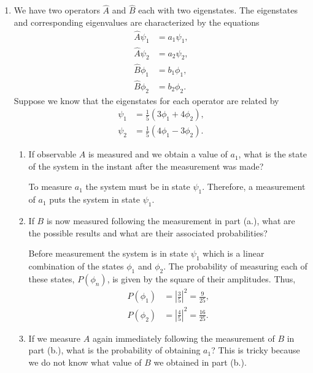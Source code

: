 \documentclass[a4paper, 12pt]{config/homework}
\begin{document}
\begin{enumerate}
\begin{enumerate}[label=(\alph*.)]
\end{enumerate}
\pagebreak
\item We have two operators \(\hat{A}\) and \(\hat{B}\) each with two eigenstates. The eigenstates and corresponding eigenvalues are characterized by the equations
\begin{align*}
\hat{A}\psi_1 &= a_1 \psi_1, \\
\hat{A}\psi_2 &= a_2 \psi_2, \\
\hat{B}\phi_1 &= b_1 \phi_1, \\
\hat{B}\phi_2 &= b_2 \phi_2.
\end{align*}
Suppose we know that the eigenstates for each operator are related by
\begin{align*}
\psi_1 &= \frac{1}{5}\left(3\phi_1 + 4\phi_2\right), \\
\psi_2 &= \frac{1}{5}\left(4\phi_1 - 3\phi_2\right).
\end{align*}
\begin{enumerate}[label=(\alph*.)]
\item If observable \(A\) is measured and we obtain a value of \(a_1\), what is the state of the system in the instant after the measurement was made?

To measure \(a_1\) the system must be in state \(\psi_1\). Therefore, a measurement of \(a_1\) puts the system in state \(\psi_1\).

\item If \(B\) is now measured following the measurement in part (a.), what are the possible results and what are their associated probabilities?

Before measurement the system is in state \(\psi_1\) which is a linear combination of the states \(\phi_1\) and \(\phi_2\). The probability of measuring each of these states, \(P(\phi_n)\), is given by the square of their amplitudes. Thus,
\begin{align*}
P(\phi_1) &= \left|\frac{3}{5}\right|^2 = \frac{9}{25}, \\
P(\phi_2) &= \left|\frac{4}{5}\right|^2 = \frac{16}{25}.
\end{align*}

\item If we measure \(A\) again immediately following the measurement of \(B\) in part (b.), what is the probability of obtaining \(a_1\)? This is tricky because we do not know what value of \(B\) we obtained in part (b.).


\end{enumerate}
\end{enumerate}
\end{document}
